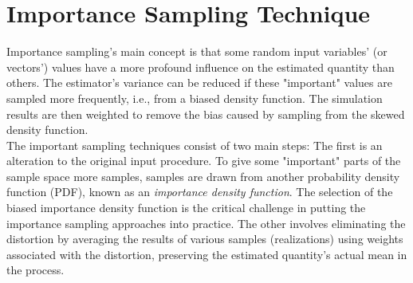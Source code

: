 \section{Importance Sampling Technique}
    Importance sampling's main concept is that some random input variables' (or vectors') values have a more profound influence on the estimated quantity than others. The estimator's variance can be reduced if these "important" values are sampled more frequently, i.e., from a biased density function. The simulation results are then weighted to remove the bias caused by sampling from the skewed density function.\\
    The important sampling techniques consist of two main steps:
    The first is an alteration to the original input procedure. To give some "important" parts of the sample space more samples, samples are drawn from another probability density function (PDF), known as an \textit{importance density function}. The selection of the biased importance density function is the critical challenge in putting the importance sampling approaches into practice. The other involves eliminating the distortion by averaging the results of various samples (realizations) using weights associated with the distortion, preserving the estimated quantity's actual mean in the process.
    
